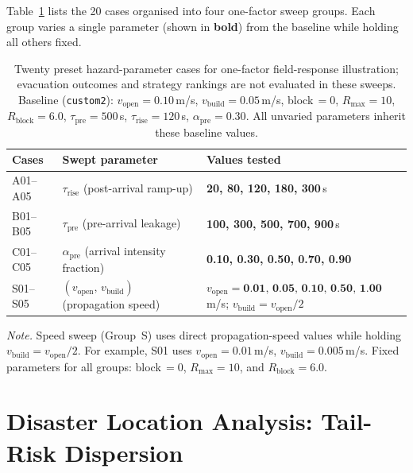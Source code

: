 \documentclass[preprint,12pt]{elsarticle}
\providecommand{\FloatBarrier}{}
\let\origsection\section
\renewcommand{\section}{\FloatBarrier\origsection}
\begin{document}
Table~\ref{tab:sm_presets} lists the 20 cases organised into four one-factor
sweep groups. Each group varies a single parameter (shown in \textbf{bold})
from the baseline while holding all others fixed.

\begin{table}[htbp]
\centering
\small
\renewcommand{\arraystretch}{1.20}
\caption{Twenty preset hazard-parameter cases for one-factor field-response
illustration; evacuation outcomes and strategy rankings are not evaluated in
these sweeps.
Baseline (\texttt{custom2}):
$v_{\mathrm{open}}\!=\!0.10$\,m/s,
$v_{\mathrm{build}}\!=\!0.05$\,m/s,
block\,$=\!0$,
$R_{\max}\!=\!10$,
$R_{\mathrm{block}}\!=\!6.0$,
$\tau_{\mathrm{pre}}\!=\!500$\,s,
$\tau_{\mathrm{rise}}\!=\!120$\,s,
$\alpha_{\mathrm{pre}}\!=\!0.30$.
All unvaried parameters inherit these baseline values.}
\label{tab:sm_presets}

\begin{tabularx}{\textwidth}{l l X}
\toprule
\textbf{Cases} & \textbf{Swept parameter} & \textbf{Values tested} \\
\midrule
A01--A05
  & $\tau_{\mathrm{rise}}$ (post-arrival ramp-up)
  & \textbf{20, 80, 120, 180, 300}\,s \\[4pt]
B01--B05
  & $\tau_{\mathrm{pre}}$ (pre-arrival leakage)
  & \textbf{100, 300, 500, 700, 900}\,s \\[4pt]
C01--C05
  & $\alpha_{\mathrm{pre}}$ (arrival intensity fraction)
  & \textbf{0.10, 0.30, 0.50, 0.70, 0.90} \\[4pt]
S01--S05
  & $(v_{\mathrm{open}},\, v_{\mathrm{build}})$ (propagation speed)
  & $v_{\mathrm{open}}=\textbf{0.01, 0.05, 0.10, 0.50, 1.00}$\,m/s;
    $v_{\mathrm{build}}=v_{\mathrm{open}}/2$ \tabularnewline
\bottomrule
\end{tabularx}

\vspace{4pt}
\footnotesize\textit{Note.}
Speed sweep (Group~S) uses direct propagation-speed values while
holding $v_{\mathrm{build}} = v_{\mathrm{open}}/2$. For example, S01 uses
$v_{\mathrm{open}} = 0.01$\,m/s, $v_{\mathrm{build}} = 0.005$\,m/s.
Fixed parameters for all groups:
block\,$= 0$, $R_{\max} = 10$, and $R_{\mathrm{block}}=6.0$.
\end{table}



\clearpage
\section{Disaster Location Analysis: Tail-Risk Dispersion}
\label{sm:disaster_locations}
\end{document}
